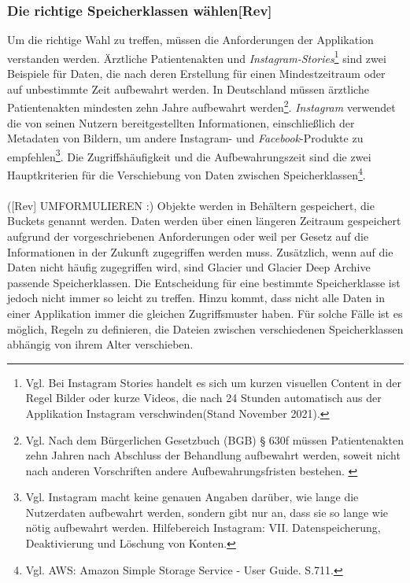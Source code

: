 \subsubsection{Die richtige Speicherklassen wählen[Rev]}
Um die richtige Wahl zu treffen, müssen die Anforderungen der Applikation verstanden werden. Ärztliche Patientenakten und \textit{Instagram-Stories}\footnote{Vgl. Bei Instagram Stories handelt es sich um kurzen visuellen Content in der Regel Bilder oder kurze Videos, die nach 24 Stunden automatisch aus der Applikation Instagram verschwinden(Stand November 2021).\cite{IG2}} sind zwei Beispiele für Daten, die nach deren Erstellung für einen Mindestzeitraum oder auf unbestimmte Zeit aufbewahrt %
werden. In Deutschland müssen ärztliche Patientenakten mindesten zehn Jahre aufbewahrt werden\footnote{Vgl. Nach dem Bürgerlichen Gesetzbuch (BGB) § 630f müssen Patientenakten zehn Jahren nach Abschluss der Behandlung aufbewahrt werden, soweit nicht nach anderen Vorschriften andere Aufbewahrungsfristen bestehen. \cite{BGB}}. \textit{Instagram} verwendet die von seinen Nutzern bereitgestellten Informationen, einschließlich der Metadaten von Bildern, um andere Instagram- und \textit{Facebook}-Produkte zu empfehlen\footnote{Vgl. Instagram macht keine genauen Angaben darüber, wie lange die Nutzerdaten aufbewahrt werden, sondern gibt nur an, dass sie so lange wie nötig aufbewahrt werden. Hilfebereich Instagram: VII. Datenspeicherung, Deaktivierung und Löschung von Konten\cite{IG3}.}.
Die Zugriffshäufigkeit und die Aufbewahrungszeit sind die zwei Hauptkriterien für die Verschiebung von Daten zwischen Speicherklassen\footnote{Vgl. AWS: Amazon Simple Storage Service - User Guide. S.711.\cite{AMZ18}}.
\\\\
([Rev] UMFORMULIEREN :)
Objekte werden in Behältern gespeichert, die Buckets genannt werden. Daten werden über einen längeren Zeitraum gespeichert aufgrund der vorgeschriebenen Anforderungen oder weil per Gesetz auf die Informationen in der Zukunft zugegriffen werden muss.
Zusätzlich, wenn auf die Daten nicht häufig zugegriffen wird, sind Glacier und Glacier Deep Archive passende Speicherklassen. Die Entscheidung für eine bestimmte Speicherklasse ist jedoch nicht immer so leicht zu treffen. %
Hinzu kommt, dass nicht alle Daten in einer Applikation immer die gleichen Zugriffsmuster haben. Für solche Fälle ist es möglich, Regeln zu definieren, die Dateien zwischen verschiedenen Speicherklassen abhängig von ihrem Alter verschieben.

